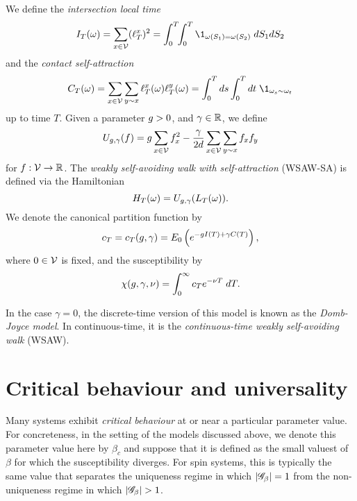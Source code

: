 We define the \emph{intersection local time}
\begin{equation}
\label{e:ITdef}
I_T(\omega) = \sum_{x\in\vertices} (\lt^x_T)^2
  =
\int_0^T \!\! \int_0^T \1_{\omega(S_1)=\omega(S_2)} \; dS_1 dS_2
\end{equation}
and the \emph{contact self-attraction}
\begin{equation}
\label{e:CTdef}
C_T(\omega) =
  \sum_{x \in \vertices} \sum_{y \sim x} \lt_T^x(\omega) \lt_T^y(\omega)
  = \int_0^T ds \int_0^T dt \; \1_{\omega_{s} \sim \omega_{t}}
\end{equation}
up to time $T$.
Given a parameter $g > 0$,
and $\gamma \in {\mathbb R}$, we define
\begin{equation}
\label{e:Udef-neg}
U_{g,\gamma}(f)
=
g \sum_{x\in\mathcal{V}} f_x^2
- \frac{\gamma}{2d}
\sum_{x\in\mathcal{V}} \sum_{y \sim x} f_x f_y
\end{equation}
for $f : \mathcal{V} \rightarrow {\mathbb R}$.
The \emph{weakly self-avoiding walk with self-attraction} (WSAW-SA) is defined via the Hamiltonian
\begin{equation}
H_T(\omega) = U_{g,\gamma}(L_T(\omega)).
\end{equation}
We denote the canonical partition function by
\begin{equation}
c_T = c_T(g, \gamma) = E_0 \left( e^{-g I(T) + \gamma C(T)} \right),
\end{equation}
where $0 \in \mathcal{V}$ is fixed, and the susceptibility by
\begin{equation}
\chi(g, \gamma, \nu) = \int_0^\infty c_T e^{-\nu T} \; dT.
\end{equation}

In the case $\gamma = 0$, the discrete-time version of this model is known as
the \emph{Domb-Joyce model}. In continuous-time, it is the
\emph{continuous-time weakly self-avoiding walk} (WSAW).


\section{Critical behaviour and universality}

Many systems exhibit \emph{critical behaviour} at or near a particular parameter value. For concreteness, in the setting of the models discussed above, we denote this parameter value here by $\beta_c$ and suppose that it is defined as the small valuest of $\beta$ for which the susceptibility diverges. For spin systems, this is typically the same value that separates the uniqueness regime in which $|\mathscr{G}_\beta| = 1$ from the non-uniqueness regime in which
$|\mathscr{G}_\beta| > 1$.

